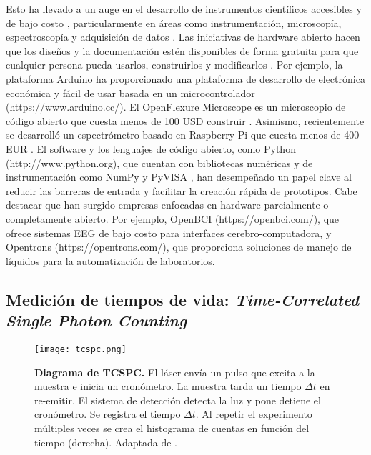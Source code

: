 Esto ha llevado a un auge en el desarrollo de instrumentos científicos accesibles y de bajo costo \cite{wenzel_open_2023, arancio_inequalities_2023}, particularmente en áreas como instrumentación, microscopía, espectroscopía y adquisición de datos \cite{jameson_fluorescent_1989, li_optical_2022, hu_fluorescent_2022}.
Las iniciativas de hardware abierto hacen que los diseños y la documentación estén disponibles de forma gratuita para que cualquier persona pueda usarlos, construirlos y modificarlos \cite{powell_democratizing_2012, oellermann_open_2022}.
Por ejemplo, la plataforma Arduino ha proporcionado una plataforma de desarrollo de electrónica económica y fácil de usar basada en un microcontrolador (https://www.arduino.cc/).
El OpenFlexure Microscope es un microscopio de código abierto que cuesta menos de 100 USD construir \cite{collins_robotic_2020}.
Asimismo, recientemente se desarrolló un espectrómetro basado en Raspberry Pi que cuesta menos de 400 EUR \cite{tunens_optical_2024}.
El software y los lenguajes de código abierto, como Python (http://www.python.org), que cuentan con bibliotecas numéricas y de instrumentación como NumPy \cite{harris_array_2020} y PyVISA \cite{grecco_pyvisa_2023}, han desempeñado un papel clave al reducir las barreras de entrada y facilitar la creación rápida de prototipos.
Cabe destacar que han surgido empresas enfocadas en hardware parcialmente o completamente abierto. Por ejemplo, OpenBCI (https://openbci.com/), que ofrece sistemas EEG de bajo costo para interfaces cerebro-computadora, y Opentrons (https://opentrons.com/), que proporciona soluciones de manejo de líquidos para la automatización de laboratorios.


\subsection{Medición de tiempos de vida: \textit{Time-Correlated Single Photon Counting}} \label{sec:intro_tcspc}


\begin{figure}
    \centering
    \texttt{[image: tcspc.png]}
    \caption{\textbf{Diagrama de TCSPC.} El láser envía un pulso que excita a la muestra e inicia un cronómetro. La muestra tarda un tiempo $\Delta t$ en re-emitir. El sistema de detección detecta la luz y pone detiene el cronómetro. Se registra el tiempo $\Delta t$. Al repetir el experimento múltiples veces se crea el histograma de cuentas en función del tiempo (derecha). Adaptada de \cite{bujjamer2020}.}
    \label{fig:tcspc}
\end{figure}

